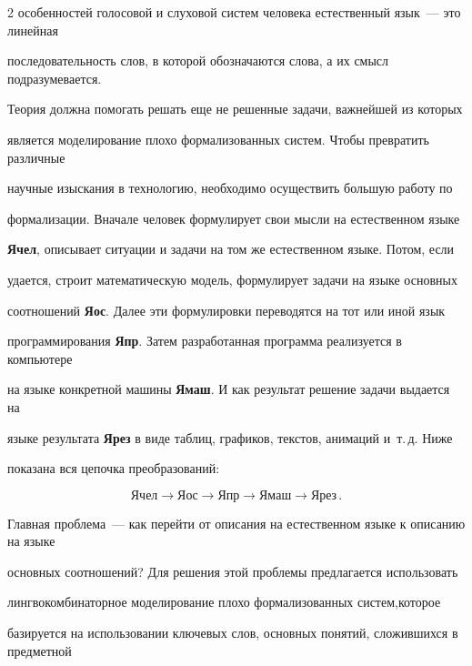 \begin{multicols}{2}
особенностей голосовой и слуховой систем человека естественный язык~--- это линейная 


последовательность слов, в которой обозначаются слова, а их смысл подразумевается.


      


      Теория должна помогать решать еще не решенные задачи, важнейшей из которых 


является моделирование плохо формализованных систем. Чтобы превратить различные 


научные изыскания в технологию, необходимо осуществить большую работу по 


формализации. Вначале человек формулирует свои мысли на естественном языке 


\textbf{Ячел}, описывает ситуации и задачи на том же естественном языке. Потом, если 


удается, строит математическую модель, формулирует задачи на языке основных 


соотношений \textbf{Яос}. Далее эти формулировки переводятся на тот или иной язык 


программирования \textbf{Япр}. Затем разработанная программа реализуется в компьютере 


на языке конкретной машины \textbf{Ямаш}. И как результат решение задачи выдается на 


языке результата \textbf{Ярез} в виде таблиц, графиков, текстов, анимаций и~т.\,д. Ниже 


показана вся цепочка преобразований:


      $$


      \mathbf{Ячел}\rightarrow \mathbf{Яос}\rightarrow \mathbf{Япр}\rightarrow 


\mathbf{Ямаш}\rightarrow\mathbf{Ярез}\,.


      $$





Главная проблема~--- как перейти от описания на естественном языке к описанию на языке 


основных соотношений? Для решения этой проблемы предлагается использовать 


линг\-во\-ком\-би\-на\-тор\-ное моделирование плохо формализованных систем,\linebreak которое 


базируется на использовании ключевых слов, основных понятий, сложившихся в предметной 



\end{multicols}
